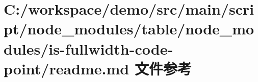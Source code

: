 \hypertarget{node__modules_2table_2node__modules_2is-fullwidth-code-point_2_r_e_a_d_m_e_8md}{}\section{C\+:/workspace/demo/src/main/script/node\+\_\+modules/table/node\+\_\+modules/is-\/fullwidth-\/code-\/point/readme.md 文件参考}
\label{node__modules_2table_2node__modules_2is-fullwidth-code-point_2_r_e_a_d_m_e_8md}

